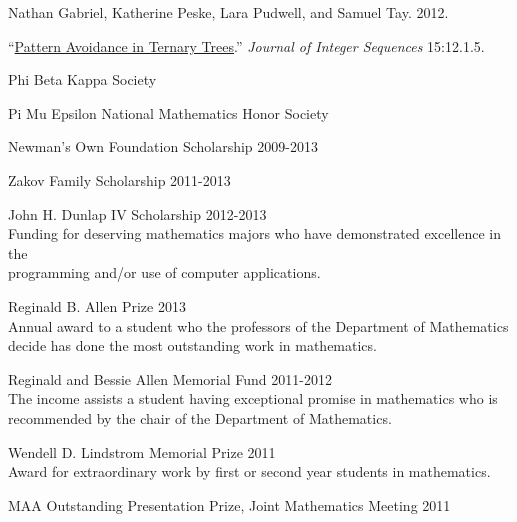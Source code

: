 \documentclass[11pt,article,oneside]{memoir}
\begin{document}
\bigskip



\ind Nathan Gabriel, Katherine Peske, Lara Pudwell, and Samuel Tay. 2012.

\noindent ``\href{http://arxiv.org/abs/1110.2225}{Pattern Avoidance in Ternary Trees}.''
  \emph{Journal of Integer Sequences} 15:12.1.5. \vspace{0.05in}

\bigskip



\ind Phi Beta Kappa Society

\ind Pi Mu Epsilon National Mathematics Honor Society

\ind Newman's Own Foundation Scholarship \hfill {\small 2009-2013}

\ind Zakov Family Scholarship \hfill {\small 2011-2013}

\ind John H. Dunlap IV Scholarship \hfill {\small 2012-2013} \\
\footnotesize
  Funding for deserving mathematics majors who have demonstrated excellence in
  the \\ programming and/or use of computer applications.
\normalsize

\ind Reginald B. Allen Prize \hfill {\small 2013} \\
\footnotesize
  Annual award to a student who the professors of the Department of
  Mathematics decide has done the most outstanding work in mathematics.
\normalsize

\ind Reginald and Bessie Allen Memorial Fund \hfill {\small 2011-2012} \\
\footnotesize
  The income assists a student having exceptional promise in mathematics who is
  recommended by the chair of the Department of Mathematics.
\normalsize

\ind Wendell D. Lindstrom Memorial Prize \hfill {\small 2011} \\
\footnotesize
  Award for extraordinary work by first or second year students in mathematics.
\normalsize

\ind MAA Outstanding Presentation Prize, Joint Mathematics Meeting \hfill {\small 2011} \\

\medskip


\end{document}
